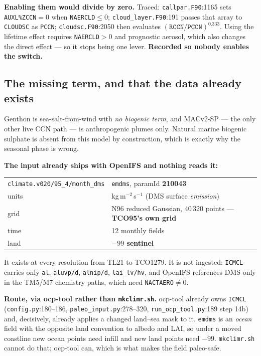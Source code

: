 \documentclass[10pt]{article}
\begin{document}
\textbf{Enabling them would divide by zero.} Traced: \texttt{callpar.F90}:1165 sets
\texttt{AUXL\%ZCCN}$=0$ when \texttt{NAERCLD}$\le0$; \texttt{cloud\_layer.F90}:191 passes
that array to \texttt{CLOUDSC} as \texttt{PCCN}; \texttt{cloudsc.F90}:2050 then evaluates
$(\texttt{RCCN}/\texttt{PCCN})^{0.333}$. Using the lifetime effect requires
\texttt{NAERCLD}$>0$ and prognostic aerosol, which also changes the direct effect --- so it
stops being one lever. \textbf{Recorded so nobody enables the switch.}

\subsection{The missing term, and that the data already exists}\label{sub:r24emdms}
Genthon is sea-salt-from-wind with \emph{no biogenic term}, and MACv2-SP --- the only other
live CCN path --- is anthropogenic plumes only. Natural marine biogenic sulphate is absent
from this model by construction, which is exactly why the seasonal phase is wrong.

\textbf{The input already ships with OpenIFS and nothing reads it:}

\begin{center}\footnotesize
\begin{tabular}{l l}
\toprule
\texttt{climate.v020/95\_4/month\_dms} & \texttt{emdms}, paramId \textbf{210043} \\
units & kg\,m$^{-2}$\,s$^{-1}$ (DMS surface \emph{emission}) \\
grid & N96 reduced Gaussian, 40\,320 points --- \textbf{TCO95's own grid} \\
time & 12 monthly fields \\
land & \textbf{$-99$ sentinel} \\
\bottomrule
\end{tabular}
\end{center}

\noindent It exists at every resolution from TL21 to TCO1279. It is not ingested:
\texttt{ICMCL} carries only \texttt{al}, \texttt{aluvp/d}, \texttt{alnip/d},
\texttt{lai\_lv/hv}, and OpenIFS references DMS only in the TM5/M7 chemistry paths, which
need \texttt{NACTAERO}$\neq0$.

\textbf{Route, via ocp-tool rather than \texttt{mkclimr.sh}.} ocp-tool already owns
\texttt{ICMCL} (\texttt{config.py}:180--186, \texttt{paleo\_input.py}:278--320,
\texttt{run\_ocp\_tool.py}:189 step 14b) and, decisively, already applies a changed
land--sea mask to it. \texttt{emdms} is an \emph{ocean} field with the opposite land
convention to albedo and LAI, so under a moved coastline new ocean points need infill and
new land points need $-99$. \texttt{mkclimr.sh} cannot do that; ocp-tool can, which is what
makes the field paleo-safe.
\end{document}
